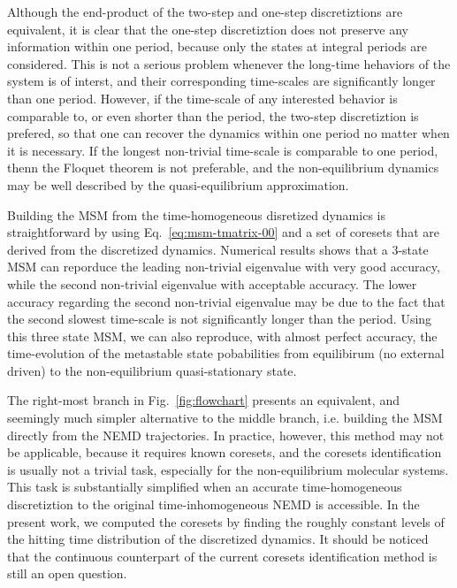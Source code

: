 \documentclass[aps, pre, preprint,unsortedaddress,a4paper,onecolumn]{revtex4}
\begin{document}
Although the end-product of the two-step and one-step discretiztions are equivalent,
it is clear that the one-step discretiztion does not preserve any information
within one period, because only the states
at integral periods are considered. This is not a serious problem
whenever the long-time hehaviors of the system is of interst, and
their corresponding time-scales are significantly longer than one
period. However, if the time-scale of any interested behavior
is comparable to, or even shorter than the period, the two-step
discretiztion is prefered, so that one can recover the dynamics within
one period no matter when it is necessary. If the longest non-trivial
time-scale is comparable to one period, thenn the Floquet theorem
is not preferable, and the non-equilibrium dynamics may be well
described by the quasi-equilibrium approximation.

Building the MSM from the time-homogeneous disretized dynamics is straightforward by
using Eq.~\eqref{eq:msm-tmatrix-00} and a set of coresets that are
derived from the discretized dynamics.  Numerical
results shows that a 3-state MSM can reporduce the leading non-trivial
eigenvalue with very good accuracy, while the second non-trivial
eigenvalue with acceptable accuracy. The lower accuracy regarding the
second non-trivial eigenvalue may be due to the fact that the second
slowest time-scale is not significantly longer than the period. Using
this three state MSM, we can also reproduce, with almost perfect
accuracy, the time-evolution of the metastable state pobabilities from
equilibirum (no external driven) to the non-equilibrium
quasi-stationary state.


The right-most branch in Fig.~\ref{fig:flowchart} presents an
equivalent, and seemingly
much simpler alternative to the middle branch, i.e. building
the MSM directly from the NEMD trajectories.
In practice, however, this method may not be applicable, because
it requires known coresets, and the coresets identification 
is usually not a trivial task, especially for the
non-equilibrium molecular systems.
This task is substantially
simplified when an accurate time-homogeneous discretiztion 
to the original time-inhomogeneous NEMD is accessible.
In the present work, we computed the coresets by
finding the roughly constant levels of the hitting time distribution 
of the discretized dynamics.
It should be noticed that the continuous
counterpart of the current coresets identification method is still an open question.
\end{document}
